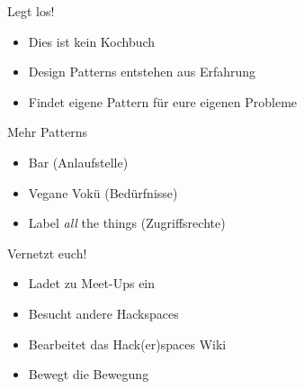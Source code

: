 \documentclass[aspectratio=43]{beamer}
\begin{document}
  \begin{frame}{Legt los!}
    \begin{itemize}
      \item Dies ist kein Kochbuch
      \pause
      \item Design Patterns entstehen aus Erfahrung
      \pause
      \item Findet eigene Pattern für eure eigenen Probleme
    \end{itemize}
  \end{frame}

  \begin{frame}{Mehr Patterns}
    \begin{itemize}
      \item Bar (Anlaufstelle)
      \item Vegane Vokü (Bedürfnisse)
      \item Label \textsl{all} the things (Zugriffsrechte)
    \end{itemize}
  \end{frame}

  \begin{frame}{Vernetzt euch!}
    \begin{itemize}
      \item Ladet zu Meet-Ups ein
      \pause
      \item Besucht andere Hackspaces
      \pause
      \item Bearbeitet das Hack(er)spaces Wiki
      \pause
      \item Bewegt die Bewegung
    \end{itemize}
  \end{frame}
\end{document}
